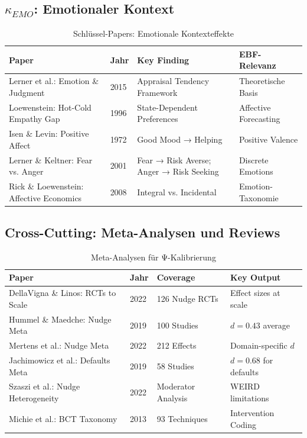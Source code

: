 \subsection{$\kappa_{EMO}$: Emotionaler Kontext}

\begin{table}[htbp]
\centering
\caption{Schlüssel-Papers: Emotionale Kontexteffekte}
\label{tab:dr-papers-emo}
\renewcommand{\arraystretch}{1.2}
\scriptsize
\begin{tabular}{@{}p{3.5cm}p{2cm}p{4cm}p{3cm}@{}}
\toprule
\textbf{Paper} & \textbf{Jahr} & \textbf{Key Finding} & \textbf{EBF-Relevanz} \\
\midrule
Lerner et al.: Emotion \& Judgment & 2015 & Appraisal Tendency Framework & Theoretische Basis \\
Loewenstein: Hot-Cold Empathy Gap & 1996 & State-Dependent Preferences & Affective Forecasting \\
Isen \& Levin: Positive Affect & 1972 & Good Mood → Helping & Positive Valence \\
Lerner \& Keltner: Fear vs. Anger & 2001 & Fear → Risk Averse; Anger → Risk Seeking & Discrete Emotions \\
Rick \& Loewenstein: Affective Economics & 2008 & Integral vs. Incidental & Emotion-Taxonomie \\
\bottomrule
\end{tabular}
\end{table}

\subsection{Cross-Cutting: Meta-Analysen und Reviews}

\begin{table}[htbp]
\centering
\caption{Meta-Analysen für Ψ-Kalibrierung}
\label{tab:dr-papers-meta}
\renewcommand{\arraystretch}{1.2}
\scriptsize
\begin{tabular}{@{}p{3.5cm}p{2cm}p{4cm}p{3cm}@{}}
\toprule
\textbf{Paper} & \textbf{Jahr} & \textbf{Coverage} & \textbf{Key Output} \\
\midrule
DellaVigna \& Linos: RCTs to Scale & 2022 & 126 Nudge RCTs & Effect sizes at scale \\
Hummel \& Maedche: Nudge Meta & 2019 & 100 Studies & $d = 0.43$ average \\
Mertens et al.: Nudge Meta & 2022 & 212 Effects & Domain-specific $d$ \\
Jachimowicz et al.: Defaults Meta & 2019 & 58 Studies & $d = 0.68$ for defaults \\
Szaszi et al.: Nudge Heterogeneity & 2022 & Moderator Analysis & WEIRD limitations \\
Michie et al.: BCT Taxonomy & 2013 & 93 Techniques & Intervention Coding \\
\bottomrule
\end{tabular}
\end{table}

